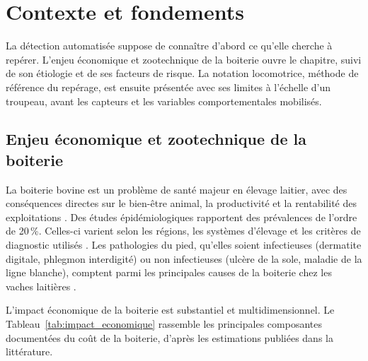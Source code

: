 \chapter{Contexte et fondements}
\label{chapitre:contexte}

La détection automatisée suppose de connaître d'abord ce qu'elle cherche à repérer. L'enjeu
économique et zootechnique de la boiterie ouvre le chapitre, suivi de son étiologie et de ses
facteurs de risque. La notation locomotrice, méthode de référence du repérage, est ensuite
présentée avec ses limites à l'échelle d'un troupeau, avant les capteurs et les variables
comportementales mobilisés.

\section{Enjeu économique et zootechnique de la boiterie}

La boiterie bovine est un problème de santé majeur en élevage laitier, avec des conséquences
directes sur le bien-être animal, la productivité et la rentabilité des exploitations
\citep{bicalho2009lameness}.
Des études épidémiologiques rapportent des prévalences de l'ordre de 20\,\%. Celles-ci varient
selon les régions, les systèmes d'élevage et les critères de diagnostic utilisés
\citep{whay2003assessment,cook2003prevalence}. Les pathologies du pied, qu'elles soient
infectieuses (dermatite digitale, phlegmon interdigité) ou non infectieuses (ulcère de la
sole, maladie de la ligne blanche),
comptent parmi les principales causes de la boiterie chez les vaches laitières
\citep{merck_hoof_origin_lameness_cattle,flower2006effect}.

L'impact économique de la boiterie est substantiel et multidimensionnel. Le
Tableau~\ref{tab:impact_economique} rassemble les principales composantes documentées du
coût de la boiterie, d'après les estimations publiées dans la littérature.


